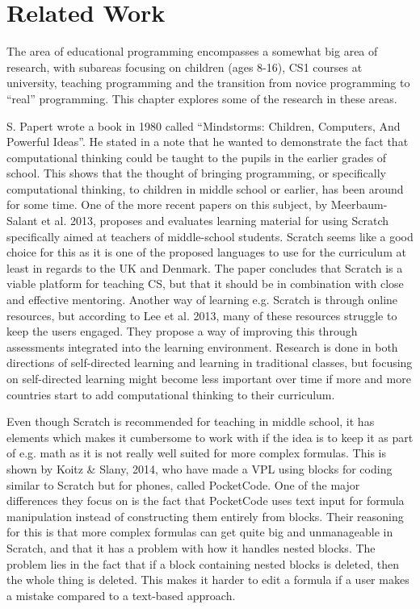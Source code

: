 \chapter{Related Work}
\label{chap:related_work}
The area of educational programming encompasses a somewhat big area of research, with subareas focusing on children (ages 8-16), CS1 courses at university, teaching programming and the transition from novice programming to ``real'' programming. This chapter explores some of the research in these areas.

S. Papert wrote a book in 1980 called ``Mindstorms: Children, Computers, And Powerful Ideas''\cite{s_papert}. He stated in a note that he wanted to demonstrate the fact that computational thinking could be taught to the pupils in the earlier grades of school\cite{turtle_origin}. This shows that the thought of bringing programming, or specifically computational thinking, to children in middle school or earlier, has been around for some time. One of the more recent papers on this subject, by Meerbaum-Salant et al. 2013\cite{learning_computer_scratch}, proposes and evaluates learning material for using Scratch specifically aimed at teachers of middle-school students. Scratch seems like a good choice for this as it is one of the proposed languages to use for the curriculum at least in regards to the UK and Denmark\cite{uk_scratch}\cite{dk_scratch}. The paper concludes that Scratch is a viable platform for teaching CS, but that it should be in combination with close and effective mentoring. Another way of learning e.g. Scratch is through online resources, but according to Lee et al. 2013\cite{ingame_assessment}, many of these resources struggle to keep the users engaged. They propose a way of improving this through assessments integrated into the learning environment. Research is done in both directions of self-directed learning and learning in traditional classes, but focusing on self-directed learning might become less important over time if more and more countries start to add computational thinking to their curriculum.

Even though Scratch is recommended for teaching in middle school, it has elements which makes it cumbersome to work with if the idea is to keep it as part of e.g. math\cite{dk_scratch} as it is not really well suited for more complex formulas. This is shown by Koitz \& Slany, 2014\cite{KoitzSlany14}, who have made a VPL using blocks for coding similar to Scratch but for phones, called PocketCode. One of the major differences they focus on is the fact that PocketCode uses text input for formula manipulation instead of constructing them entirely from blocks. Their reasoning for this is that more complex formulas can get quite big and unmanageable in Scratch, and that it has a problem with how it handles nested blocks. The problem lies in the fact that if a block containing nested blocks is deleted, then the whole thing is deleted. This makes it harder to edit a formula if a user makes a mistake compared to a text-based approach.

